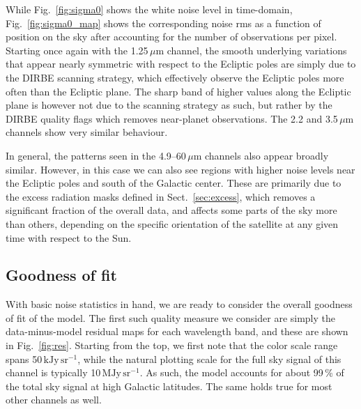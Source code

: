 \documentclass{aa}
\begin{document}
While Fig.~\ref{fig:sigma0} shows the white noise level in
time-domain, Fig.~\ref{fig:sigma0_map} shows the corresponding noise
rms as a function of position on the sky after accounting for the
number of observations per pixel. Starting once again with the
1.25$\,\mu$m channel, the smooth underlying variations that appear
nearly symmetric with respect to the Ecliptic poles are simply due to
the DIRBE scanning strategy, which effectively observe the Ecliptic
poles more often than the Ecliptic plane. The sharp band of higher
values along the Ecliptic plane is however not due to the scanning
strategy as such, but rather by the DIRBE quality flags which removes
near-planet observations. The 2.2 and 3.5$\,\mu$m channels show very
similar behaviour.

In general, the patterns seen in the 4.9--60$\,\mu$m channels also
appear broadly similar. However, in this case we can also see regions
with higher noise levels near the Ecliptic poles and south of the
Galactic center. These are primarily due to the excess radiation masks
defined in Sect.~\ref{sec:excess}, which removes a significant
fraction of the overall data, and affects some parts of the sky more
than others, depending on the specific orientation of the satellite at
any given time with respect to the Sun.

  




\subsection{Goodness of fit}

With basic noise statistics in hand, we are ready to consider the
overall goodness of fit of the model. The first such quality measure
we consider are simply the data-minus-model residual maps for each
wavelength band, and these are shown in Fig.~\ref{fig:res}. Starting
from the top, we first note that the color scale range spans
50\,$\mathrm{kJy\,sr^{-1}}$, while the natural plotting scale for the full sky signal
of this channel is typically 10\,M$\mathrm{Jy\,sr^{-1}}$. As such, the model accounts
for about 99\,\% of the total sky signal at high Galactic
latitudes. The same holds true for most other channels as well.
\end{document}

